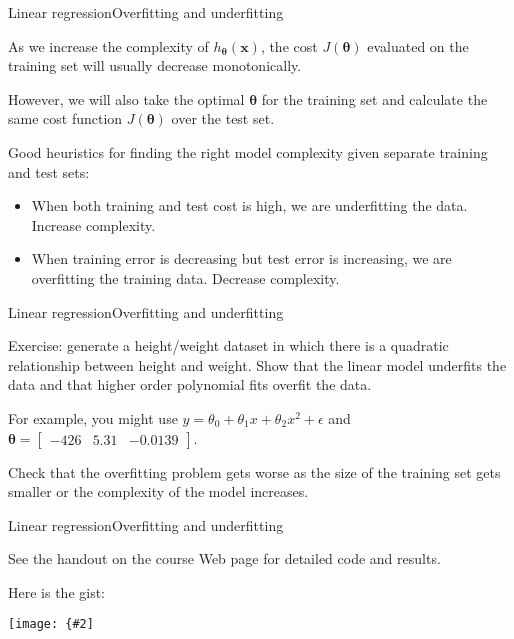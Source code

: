 \documentclass{beamer}
\renewcommand{\vec}[1]{\boldsymbol{#1}}
\newcommand{\myfig}[3]{\centerline{\texttt{[image: \{\#2]}}}
    \centerline{\scriptsize #3}}
\begin{document}
\begin{frame}{Linear regression}{Overfitting and underfitting}

  As we increase the complexity of $h_{\vec{\theta}}(\vec{x})$,
  the cost $J(\vec{\theta})$ evaluated on the training set will usually
  decrease monotonically.

  \medskip

  However, we will also take the optimal $\vec{\theta}$ for the training set
  and calculate the same cost function $J(\vec{\theta})$ over the test set.

  \medskip

  Good heuristics for finding the right model complexity given
  separate training and test sets:
  \begin{itemize}
  \item When both training and test cost is high, we are \alert{underfitting}
    the data. Increase complexity.
  \item When training error is decreasing but test error is
    increasing, we are \alert{overfitting} the training data. Decrease
    complexity.
  \end{itemize}
  
\end{frame}


\begin{frame}{Linear regression}{Overfitting and underfitting}

  \alert{Exercise}: generate a height/weight dataset in which there is
  a \alert{quadratic} relationship between height and weight. Show
  that the linear model \alert{underfits} the data and that higher
  order polynomial fits \alert{overfit} the data.

  \medskip

  For example, you might use $y = \theta_0 + \theta_1 x + \theta_2 x^2
  + \epsilon$ and $\vec{\theta} = \begin{bmatrix} -426 & 5.31 &
    -0.0139 \end{bmatrix}$.

  \medskip

  Check that the overfitting problem gets worse as the size of
  the training set gets smaller or the complexity of the model
  increases.
  
\end{frame}


\begin{frame}{Linear regression}{Overfitting and underfitting}

  See the handout on the course Web page for detailed code and results.

  \medskip

  Here is the gist:

  \medskip

  \myfig{4in}{over-under}{}
  
\end{frame}
\end{document}
